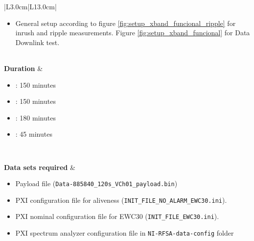\begin{table}[H]
\begin{tabular}{|L{3.0cm}|L{13.0cm}|}
\begin{minipage}[t]{\linewidth}
\begin{itemize}[nosep,after=\strut]
		\item General setup according to figure \ref{fig:setup_xband_funcional_ripple} for inrush and ripple measurements. Figure \ref{fig:setup_xband_funcional} for Data Downlink test.
		\end{itemize}
	\end{minipage}	
		\\ 
		\hline
		\textbf{Duration} & \begin{minipage}[t]{\linewidth}
	\begin{itemize}[nosep,after=\strut]
		\item {}: 150 minutes
		\item {}: 150 minutes 

		\item {}: 180 minutes 		
		\item {}: 45 minutes 
		\end{itemize}
	\end{minipage}
	\\ \hline
	
	\textbf{Data sets required} &  \begin{minipage}[t]{\linewidth}
		\begin{itemize}[nosep,after=\strut]
			\item Payload file (\texttt{Data-885840\_120s\_VCh01\_payload.bin})
			\item \comEgse\xspace PXI configuration file for aliveness (\texttt{INIT\_FILE\_NO\_ALARM\_EWC30.ini}).
			\item \comEgse\xspace PXI nominal configuration file for EWC30 (\texttt{INIT\_FILE\_EWC30.ini}).
			\item PXI spectrum analyzer configuration file in \texttt{NI-RFSA-data-config} folder
				\end{itemize}
			\end{minipage}\\
		\hline
		

\end{tabular}
\end{table}
